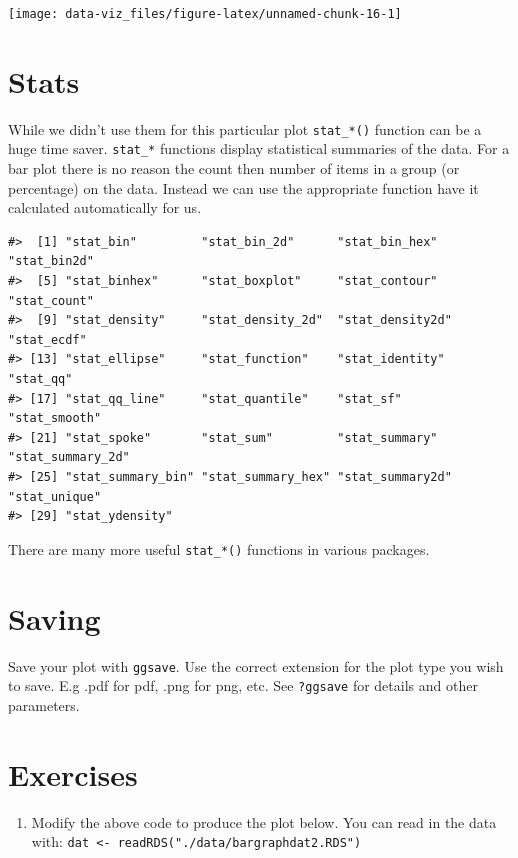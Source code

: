 \documentclass[]{book}
\providecommand{\tightlist}{%
  \setlength{\itemsep}{0pt}\setlength{\parskip}{0pt}}
\theoremstyle{definition}
\theoremstyle{definition}
\theoremstyle{definition}
\theoremstyle{remark}
\begin{document}
\begin{center}\texttt{[image: data-viz\_files/figure-latex/unnamed-chunk-16-1]} \end{center}

\hypertarget{stats}{%
\section{Stats}\label{stats}}

While we didn't use them for this particular plot \texttt{stat\_*()}
function can be a huge time saver. \texttt{stat\_*} functions display
statistical summaries of the data. For a bar plot there is no reason the
count then number of items in a group (or percentage) on the data.
Instead we can use the appropriate function have it calculated
automatically for us.

\begin{verbatim}
#>  [1] "stat_bin"         "stat_bin_2d"      "stat_bin_hex"     "stat_bin2d"      
#>  [5] "stat_binhex"      "stat_boxplot"     "stat_contour"     "stat_count"      
#>  [9] "stat_density"     "stat_density_2d"  "stat_density2d"   "stat_ecdf"       
#> [13] "stat_ellipse"     "stat_function"    "stat_identity"    "stat_qq"         
#> [17] "stat_qq_line"     "stat_quantile"    "stat_sf"          "stat_smooth"     
#> [21] "stat_spoke"       "stat_sum"         "stat_summary"     "stat_summary_2d" 
#> [25] "stat_summary_bin" "stat_summary_hex" "stat_summary2d"   "stat_unique"     
#> [29] "stat_ydensity"
\end{verbatim}

There are many more useful \texttt{stat\_*()} functions in various
packages.

\hypertarget{saving}{%
\section{Saving}\label{saving}}

Save your plot with \texttt{ggsave}. Use the correct extension for the
plot type you wish to save. E.g .pdf for pdf, .png for png, etc. See
\texttt{?ggsave} for details and other parameters.

\hypertarget{exercises-2}{%
\section{Exercises}\label{exercises-2}}

\begin{enumerate}
\def\labelenumi{\arabic{enumi}.}
\tightlist
\item
  Modify the above code to produce the plot below. You can read in the
  data with:
  \texttt{dat\ \textless{}-\ readRDS("./data/bargraphdat2.RDS")}
\end{enumerate}
\end{document}
